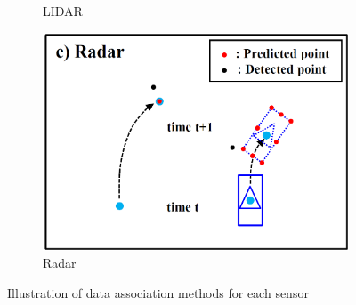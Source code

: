 \begin{figure}
\begin{subfigure}[b]{0.3\textwidth}
        \caption{LIDAR}
        \label{fig:obstacle_b}
    \end{subfigure}
    \begin{subfigure}[b]{0.3\textwidth}
        \includegraphics[width=\textwidth]{src/pic/obstacle_c.png}
        \caption{Radar}
        \label{fig:obstacle_c}
    \end{subfigure}
    \caption{Illustration of data association methods for each sensor\cite{Cho_2014}}
    \label{fig:obstacle}
\end{figure}
